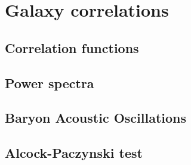 \chapter{Galaxy correlations}

\section{Correlation functions}
\section{Power spectra}
\section{Baryon Acoustic Oscillations}
\section{Alcock-Paczynski test}
